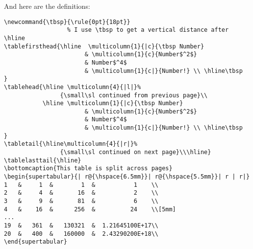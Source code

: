 And here are the definitions:
\begin{verbatim}
\newcommand{\tbsp}{\rule{0pt}{18pt}}
                  % I use \tbsp to get a vertical distance after \hline
\tablefirsthead{\hline  \multicolumn{1}{|c}{\tbsp Number}
                       & \multicolumn{1}{c}{Number$^2$}
                       & Number$^4$
                       & \multicolumn{1}{c|}{Number!} \\ \hline\tbsp  }
\tablehead{\hline \multicolumn{4}{|l|}%
                {\small\sl continued from previous page}\\
           \hline \multicolumn{1}{|c}{\tbsp Number}
                       & \multicolumn{1}{c}{Number$^2$}
                       & Number$^4$
                       & \multicolumn{1}{c|}{Number!} \\ \hline\tbsp  }
\tabletail{\hline\multicolumn{4}{|r|}%
                {\small\sl continued on next page}\\\hline}
\tablelasttail{\hline}
\bottomcaption{This table is split across pages}
\begin{supertabular}{| r@{\hspace{6.5mm}}| r@{\hspace{5.5mm}}| r | r|}
1   &     1  &        1  &           1    \\
2   &     4  &       16  &           2    \\
3   &     9  &       81  &           6    \\
4   &    16  &      256  &          24    \\[5mm]
...
19  &   361  &   130321  &  1.21645100E+17\\
20  &   400  &   160000  &  2.43290200E+18\\
\end{supertabular}
\end{verbatim}

